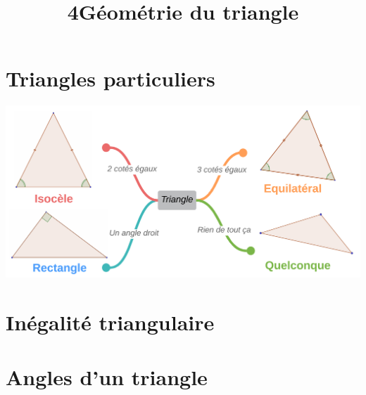 \documentclass[12pt,a4paper]{article}
\date{}
\title{\textcircled{{\normalsize{4}}}Géométrie du triangle}
\begin{document}
\maketitle








\section{Triangles particuliers}

\begin{center}
	\includegraphics[scale=0.81]{triangles}
\end{center}

\newpage

\section{Inégalité triangulaire}





%
%

\newpage

\section{Angles d'un triangle}


\end{document}
